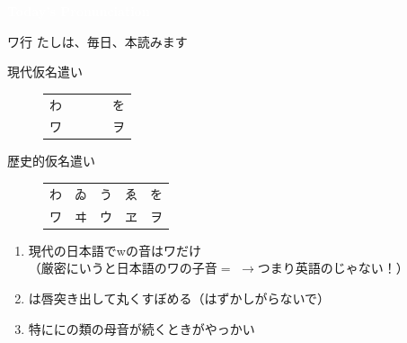\documentclass[aspectratio=169, xcolor={dvipsnames,table}]{beamer}
\begin{document}
\begin{frame}
  \centering
  \textcolor{white}{\Huge\bfseries Today's Pronunciation}\pause

  \vspace{30pt}

  \textcolor{white}{\Huge\bfseries {}}

  \vfill

  \hfill\hyperlink{ex}{}
\end{frame}
\begin{frame}[plain]{ワ行}
  たしは、毎日、本読みます \pause

  \begin{description}
    \item[現代仮名遣い　]
          \begin{tabular}[t]{ccccc}
            わ &  &  &  & を \\
            ワ &  &  &  & ヲ
          \end{tabular}\pause

    \item[歴史的仮名遣い]
          \begin{tabular}[t]{ccccc}
            わ & ゐ & う & ゑ & を \\
            ワ & ヰ & ウ & ヱ & ヲ
          \end{tabular}
  \end{description}
  \pause

  \begin{enumerate}
    \item 現代の日本語でwの音はワだけ\\ （厳密にいうと日本語のワの子音$=$\textipa{[\textsublhalfring{w}]}
          $\longrightarrow$つまり英語のじゃない！）\pause

    \item {}は唇突き出して丸くすぼめる（はずかしがらないで）\pause

    \item 特ににの類の母音が続くときがやっかい
  \end{enumerate}
\end{frame}
\end{document}
